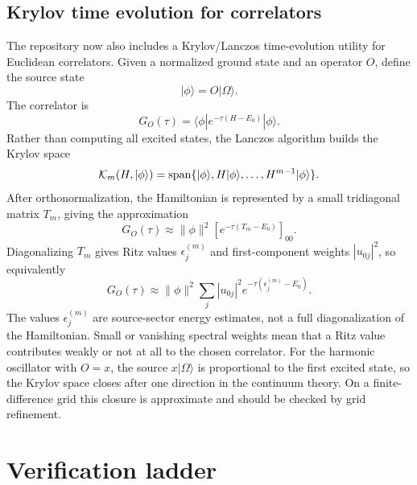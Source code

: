 \documentclass[11pt]{article}
\begin{document}
\subsection{Krylov time evolution for correlators}

The repository now also includes a Krylov/Lanczos time-evolution utility for
Euclidean correlators.  Given a normalized ground state and an operator \(O\),
define the source state
\begin{equation}
  |\phi\rangle = O|\Omega\rangle .
\end{equation}
The correlator is
\begin{equation}
  G_O(\tau)
  =
  \langle \phi|e^{-\tau(H-E_0)}|\phi\rangle .
\end{equation}
Rather than computing all excited states, the Lanczos algorithm builds the
Krylov space
\begin{equation}
  {\cal K}_m(H,|\phi\rangle)
  =
  {\rm span}\{|\phi\rangle,H|\phi\rangle,\ldots,H^{m-1}|\phi\rangle\}.
\end{equation}
After orthonormalization, the Hamiltonian is represented by a small tridiagonal
matrix \(T_m\), giving the approximation
\begin{equation}
  G_O(\tau)
  \approx
  \|\phi\|^2
  \left[
    e^{-\tau(T_m-E_0)}
  \right]_{00}.
\end{equation}
Diagonalizing \(T_m\) gives Ritz values \(\epsilon_j^{(m)}\) and first-component
weights \(|u_{0j}|^2\), so equivalently
\begin{equation}
  G_O(\tau)
  \approx
  \|\phi\|^2
  \sum_j |u_{0j}|^2
  e^{-\tau(\epsilon_j^{(m)}-E_0)} .
\end{equation}
The values \(\epsilon_j^{(m)}\) are source-sector energy estimates, not a full
diagonalization of the Hamiltonian.  Small or vanishing spectral weights mean
that a Ritz value contributes weakly or not at all to the chosen correlator.
For the harmonic oscillator with \(O=x\), the source \(x|\Omega\rangle\) is
proportional to the first excited state, so the Krylov space closes after one
direction in the continuum theory.  On a finite-difference grid this closure is
approximate and should be checked by grid refinement.

\section{Verification ladder}
\end{document}
